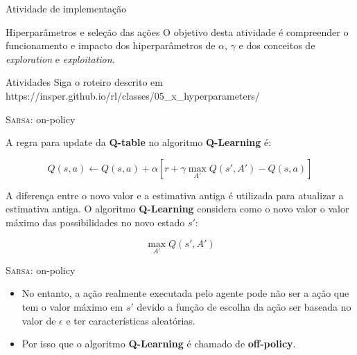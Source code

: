 \documentclass{beamer}
\begin{document}
\begin{frame}{Atividade de implementação}
		
	\begin{alertblock}{Hiperparâmetros e seleção das ações}
		O objetivo desta atividade é compreender o funcionamento e impacto dos hiperparâmetros de $\alpha$, $\gamma$ e dos conceitos de \textit{exploration} e \textit{exploitation}.
	\end{alertblock}
	
	\begin{block}{Atividades}
		Siga o roteiro descrito em https://insper.github.io/rl/classes/05\_x\_hyperparameters/ \href{https://insper.github.io/rl/classes/05_x_hyperparameters/}
		{}
	\end{block}

\end{frame}

\begin{frame}{\textsc{Sarsa}: on-policy}
	
	A regra para update da \textbf{Q-table} no algoritmo \textbf{Q-Learning} é: 
	
	\begin{equation}
	Q(s,a) \leftarrow Q(s,a) + \alpha [r +\gamma \max_{A'}{Q(s', A')} - Q(s,a)]
	\end{equation}

	A diferença entre o novo valor e a estimativa antiga é utilizada para atualizar a estimativa antiga. O algoritmo \textbf{Q-Learning} considera como o novo valor o valor máximo das possibilidades no novo estado $s'$: 
	
	\begin{equation}
	\max_{A'}{Q(s', A')}
	\end{equation}
	
\end{frame}


\begin{frame}{\textsc{Sarsa}: on-policy}
	
	\begin{itemize}
		
	\item No entanto, a ação realmente executada pelo agente pode não ser a ação que tem o valor máximo em $s'$ devido a função de escolha da ação ser baseada no valor de $\epsilon$ e ter características aleatórias.
	
	\item Por isso que o algoritmo \textbf{Q-Learning} é chamado de \textbf{off-policy}.   
\end{itemize}
	
\end{frame}
\end{document}
